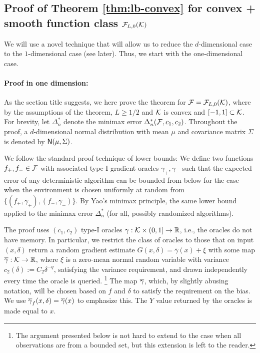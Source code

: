 \subsection{Proof of Theorem \ref{thm:lb-convex} for convex + smooth function class $\mathcal{F}_{L,0}(\mathcal{K})$}
\label{sec:appendix-lbconvex}
We will use a novel technique that will allow us to  reduce the $d$-dimensional case to the $1$-dimensional case (see later).
Thus, we start with the one-dimensional case.

\paragraph{Proof in one dimension:} 
As the section title suggests, we here prove the theorem for $\mathcal{F} = \mathcal{F}_{L,0}(\mathcal{K})$, where 
by the assumptions of the theorem, $L\ge 1/2$ and $\mathcal{K}$ is convex and $[-1,1]\subset \mathcal{K}$.
For brevity, let $\Delta_n^{*}$ denote the minimax error $\Delta_n^*(\mathcal{F}, c_1,c_2)$. 
Throughout the proof, a $d$-dimensional normal distribution with mean $\mu$ and covariance matrix $\Sigma$ is denoted by $\mathsf{N}(\mu, \Sigma)$.

We follow the standard proof technique of lower bounds: We define two functions $f_+, f_- \in \mathcal{F}$ with associated type-I gradient oracles $\gamma_+,\gamma_-$ such that the expected error of any deterministic algorithm can be bounded from below for the case when the environment is chosen uniformly at random from $\{(f_+,\gamma_+),(f_-,\gamma_-)\}$. By Yao's minimax principle, the same lower bound applied to the minimax error $\Delta_n^{*}$ (for all, possibly randomized algorithms).

The proof uses $(c_1,c_2)$ type-I oracles $\gamma: \mathcal{K}\times (0,1] \to \mathbb{R}$, i.e., the oracles do not have memory.
In particular, we restrict the class of oracles to those that on input $(x,\delta)$ return 
a random gradient estimate $G(x,\delta) = \overline{\gamma}(x) + \xi$ with some map $\overline{\gamma}: \mathcal{K} \to \mathbb{R}$,
where $\xi$ is a zero-mean normal random variable with variance $c_2(\delta):= C_2 \delta^{-q}$, satisfying the variance requirement, and drawn independently every time the oracle is queried.%
\footnote{The argument presented below is not hard to extend to the case when all observations are from a bounded set,
but this extension is left to the reader.}
The map $\overline{\gamma}$, which, by slightly abusing notation, will be chosen based on $f$ and $\delta$ to satisfy the requirement on the bias. 
We  use $\overline{\gamma}_f(x,\delta) = \overline{\gamma}(x)$ to emphasize this. The $Y$ value returned by the oracles is made equal to $x$.

